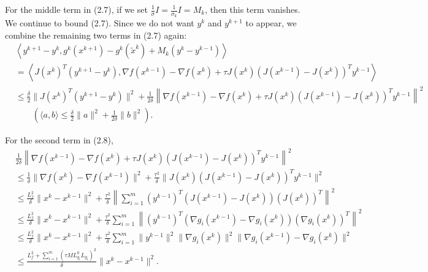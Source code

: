 \documentclass[11pt]{article}
\numberwithin{equation}{section}
\begin{document}
For the middle term in (2.7), if we set $\frac{1}{\sigma}I=\frac{1}{\sigma_k}I=M_k$, then this term vanishes. We continue to bound (2.7). Since we do not want $y^k$ and $y^{k+1}$ to appear, we combine the remaining two terms in (2.7) again:
\begin{align*}
&\left\langle y^{k+1}-y^k,
g^k(x^{k+1})-g^k(\widetilde{x}^k)+M_k(y^k-y^{k-1})\right\rangle\\
&=\left\langle J(x^k)^T(y^{k+1}-y^k),
\nabla f(x^{k-1})-\nabla f(x^k)
+\tau J(x^k)\left(J(x^{k-1})-J(x^k)\right)^Ty^{k-1}\right\rangle\\
&\le \frac{\delta}{2}\|J(x^k)^T(y^{k+1}-y^k)\|^2
+\frac{1}{2\delta}\left\|\nabla f(x^{k-1})-\nabla f(x^k)
+\tau J(x^k)\left(J(x^{k-1})-J(x^k)\right)^Ty^{k-1}\right\|^2\\
&\qquad\left(\langle a,b\rangle\le\frac{\delta}{2}\|a\|^2+\frac{1}{2\delta}\|b\|^2\right). \tag{2.8}
\end{align*}

For the second term in (2.8),
\begin{align*}
&\frac{1}{2\delta}\left\|\nabla f(x^{k-1})-\nabla f(x^k)
+\tau J(x^k)\left(J(x^{k-1})-J(x^k)\right)^Ty^{k-1}\right\|^2 \tag{2.9}\\
&\le \frac{1}{\delta}\|\nabla f(x^k)-\nabla f(x^{k-1})\|^2
+\frac{\tau^2}{\delta}\|J(x^k)\left(J(x^{k-1})-J(x^k)\right)^Ty^{k-1}\|^2\\
&\le \frac{L_f^2}{\delta}\|x^k-x^{k-1}\|^2
+\frac{\tau^2}{\delta}\left\|\sum_{i=1}^m(y^{k-1})^T\left(J(x^{k-1})-J(x^k)\right)(J(x^k))^T\right\|^2\\
&\le \frac{L_f^2}{\delta}\|x^k-x^{k-1}\|^2
+\frac{\tau^2}{\delta}\sum_{i=1}^m
\left\|(y^{k-1})^T(\nabla g_i(x^{k-1})-\nabla g_i(x^k))(\nabla g_i(x^k))^T\right\|^2\\
&\le \frac{L_f^2}{\delta}\|x^k-x^{k-1}\|^2
+\frac{\tau^2}{\delta}\sum_{i=1}^m\|y^{k-1}\|^2\|\nabla g_i(x^k)\|^2
\|\nabla g_i(x^{k-1})-\nabla g_i(x^k)\|^2\\
&\le \frac{L_f^2+\sum_{i=1}^m(\tau M L_{g_i}^0L_{g_i})^2}{\delta}\|x^k-x^{k-1}\|^2. \tag{2.10}
\end{align*}
\end{document}
